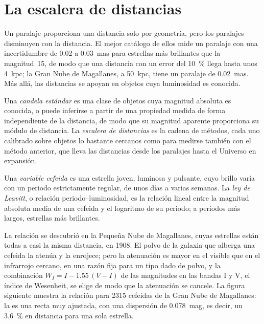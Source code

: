 \section{La escalera de distancias}\label{sec:b3:milky-way-galaxies:ladder}

Un paralaje proporciona una distancia solo por geometría, pero los paralajes disminuyen
con la distancia. El mejor catálogo de ellos mide un paralaje con una
incertidumbre de 0.02 a \qty{0.03}{mas} para estrellas más brillantes que la
magnitud~15, de modo que una distancia con un error del \qty{10}{\percent} llega hasta
unos \qty{4}{kpc}; la Gran Nube de Magallanes, a \qty{50}{kpc}, tiene un
paralaje de \qty{0.02}{mas}. Más allá, las distancias se apoyan en objetos cuya
luminosidad es conocida.

\begin{definition}\label{def:b3:milky-way-galaxies:ladder}
Una \emph{candela estándar} es una clase de objetos
cuya magnitud absoluta es conocida, o puede inferirse a partir de una propiedad
medida de forma independiente de la distancia, de modo que su magnitud aparente proporciona
su módulo de distancia. La \emph{escalera de distancias} es
la cadena de métodos, cada uno calibrado sobre objetos lo bastante cercanos como para
medirse también con el método anterior, que lleva las distancias desde los
paralajes hasta el Universo en expansión.
\end{definition}

\begin{definition}\label{def:b3:milky-way-galaxies:cepheid}
Una \emph{variable cefeida} es una estrella joven, luminosa y
pulsante, cuyo brillo varía con un periodo estrictamente regular,
de unos días a varias semanas. La \emph{ley de Leavitt},
o relación periodo--luminosidad, es la relación lineal entre la magnitud absoluta media
de una cefeida y el logaritmo de su periodo; a periodos más largos,
estrellas más brillantes.
\end{definition}

La relación se descubrió en la Pequeña Nube de Magallanes, cuyas estrellas
están todas a casi la misma distancia, en 1908. El polvo de la galaxia que
alberga una cefeida la atenúa y la enrojece; pero la atenuación es mayor
en el visible que en el infrarrojo cercano, en una razón fija para un tipo dado de
polvo, y la combinación $W_I = I - 1.55\,(V - I)$ de las magnitudes en
las bandas I y V, el índice de Wesenheit, se elige de modo que la atenuación
se cancele. La figura siguiente muestra la relación para 2315 cefeidas de la Gran Nube de Magallanes:
la  es una recta muy ajustada, con una dispersión de
\qty{0.078}{mag}, es decir, un \qty{3.6}{\percent} en distancia para una sola
estrella.

